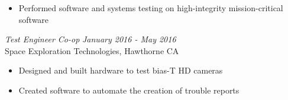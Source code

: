 \documentclass[line,mmmargin]{res}
\begin{document}
\begin{resume}
\begin{itemize}
		\item Performed software and systems testing on high-integrity mission-critical software
	\end{itemize}
	\vspace{-10pt}
{\sl  Test Engineer Co-op} \hfill {\sl January 2016 - May 2016}\\
	Space Exploration Technologies, Hawthorne CA
	\begin{itemize}  \itemsep -2pt %
		\item Designed and built hardware to test bias-T HD cameras
		\item Created software to automate the creation of trouble reports
	\end{itemize}
 




\end{resume}
\end{document}
